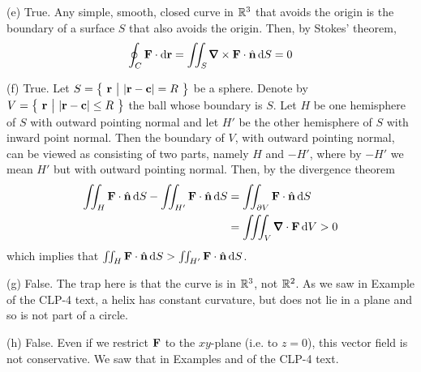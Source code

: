 \begin{solution}
\noindent (e)
True. Any simple, smooth, closed curve in $\mathbb{R}^3$ that avoids the origin
is the boundary of a surface $S$ that also avoids the origin. Then,
by Stokes' theorem,
\begin{equation*}
\oint_C\vF\cdot\dee{\vr} 
=\dblInt_S \vnabla\times\vF\cdot\hn\,\dee{S}
=0
\end{equation*}

\noindent (f)
True. Let $S=\big\{ \ \mathbf{r}\ \big|\ |\mathbf{r}-\mathbf{c}|=R\ \big\}$ be a sphere. 
Denote by $V=\big\{ \ \mathbf{r}\ \big|\ |\mathbf{r}-\mathbf{c}|\le R\ \big\}$ the ball whose boundary is $S$.
Let $H$ be one hemisphere of $S$ with outward pointing normal and let 
$H'$ be the other hemisphere of $S$ with inward
point normal. Then the boundary of $V$, with outward pointing normal,
can be viewed as consisting of two parts, namely $H$ and $-H'$,
where by $-H'$ we mean $H'$ but with outward pointing normal. 
Then, by the divergence theorem
\begin{align*}
\dblInt_H \vF\cdot\hn\,\dee{S} - 
\dblInt_{H'} \vF\cdot\hn\,\dee{S}
&=\dblInt_{\partial V} \vF\cdot\hn\,\dee{S} \\
&=\tripInt_V \vnabla\cdot\vF\,\dee{V}>0
\end{align*} 
which implies that $\iint_H \mathbf{F}\cdot\hat{\mathbf{n}}\,\mathrm{d}S > 
\iint_{H'} \mathbf{F}\cdot\hat{\mathbf{n}}\,\mathrm{d}S$.

\noindent (g)
False. The trap here is that the curve is in $\mathbb{R}^3$, not $\mathbb{R}^2$. 
As we saw in Example  of the CLP-4 text, 
a helix has constant curvature, but does not lie in a plane and so 
is not part of a circle. 

\noindent (h)
False. Even if we restrict $\mathbf{F}$ to the $xy$-plane (i.e. to $z=0$), 
this vector field is not conservative. We saw that in Examples 
 and
 of the CLP-4 text.


\end{solution}
